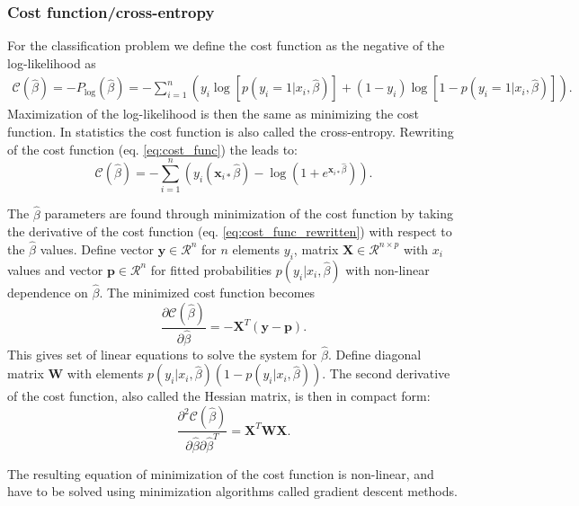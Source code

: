 \documentclass[12pt,a4paper,english]{article}
\begin{document}
\subsubsection{Cost function/cross-entropy}
\label{subsect:Cost_func}
For the classification problem we define the cost function as the negative of the log-likelihood as 
\begin{align}
\label{eq:cost_func}
\mathcal{C}(\hat{\beta})=-P_{\log }(\hat{\beta})= -\sum_{i=1}^{n}\left(y_i\log[p(y_i=1|x_i,\hat{\beta})]+(1-y_i)\log[1-p(y_i=1|x_i,\hat{\beta})]\right).
\end{align}
Maximization of the log-likelihood is then the same as minimizing the cost function. In statistics the cost function is also called the cross-entropy. Rewriting of the cost function (eq. \ref{eq:cost_func}) the leads to:
\begin{equation}
\label{eq:cost_func_rewritten}
\mathcal{C}(\hat{\beta})=-\sum_{i=1}^{n}\left(y_i(\textbf{x}_{i*}\hat{\beta})-\log(1+e^{\textbf{x}_{i*}\hat{\beta}})\right).
\end{equation}

The $\hat{\beta}$ parameters are found through minimization of the cost function by taking the derivative of the cost function (eq. \ref{eq:cost_func_rewritten}) with respect to the $\hat{\beta}$ values. Define vector $\textbf{y}\in\mathcal{R}^n$ for $n$ elements $y_i$, matrix $\textbf{X}\in\mathcal{R}^{n\times p}$ with $x_i$ values and vector $\textbf{p}\in\mathcal{R}^n$ for fitted probabilities $p(y_i|x_i,\hat{\beta})$ with non-linear dependence on $\hat{\beta}$. The minimized cost function becomes
\begin{equation}
\label{eq:min_cost_func}
\frac{\partial \mathcal{C}(\hat{\beta})}{\partial \hat{\beta}}=-\textbf{X}^T(\textbf{y}-\textbf{p}).
\end{equation}
This gives set of linear equations to solve the system for $\hat{\beta}$. Define diagonal matrix \textbf{W} with elements $p(y_i|x_i,\hat{\beta})(1-p(y_i|x_i,\hat{\beta}))$. The second derivative of the cost function, also called the Hessian matrix, is then in compact form:
\begin{equation}
\label{eq:Hessian}
\frac{\partial^2 \mathcal{C}(\hat{\beta})}{\partial \hat{\beta}\partial \hat{\beta}^T}=\textbf{X}^T\textbf{W}\textbf{X}.
\end{equation}

The resulting equation of minimization of the cost function is non-linear, and have to be solved using minimization algorithms called gradient descent methods.
\end{document}
